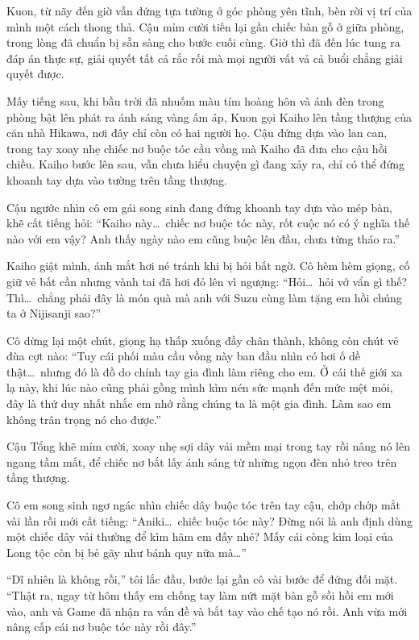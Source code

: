 ﻿\documentclass[../main.tex]{subfiles}
\begin{document}
Kuon, từ nãy đến giờ vẫn đứng tựa tường ở góc phòng yên tĩnh, bèn rời vị trí của mình một cách thong thả. Cậu mỉm cười tiến lại gần chiếc bàn gỗ ở giữa phòng, trong lòng đã chuẩn bị sẵn sàng cho bước cuối cùng. Giờ thì đã đến lúc tung ra đáp án thực sự, giải quyết tất cả rắc rối mà mọi người vất vả cả buổi chẳng giải quyết được.

\ct


Mấy tiếng sau, khi bầu trời đã nhuốm màu tím hoàng hôn và ánh đèn trong phòng bật lên phát ra ánh sáng vàng ấm áp, Kuon gọi Kaiho lên tầng thượng của căn nhà Hikawa, nơi đây chỉ còn có hai người họ. Cậu đứng dựa vào lan can, trong tay xoay nhẹ chiếc nơ buộc tóc cầu vồng mà Kaiho đã đưa cho cậu hồi chiều. Kaiho bước lên sau, vẫn chưa hiểu chuyện gì đang xảy ra, chỉ có thể đứng khoanh tay dựa vào tường trên tầng thượng.

Cậu ngước nhìn cô em gái song sinh đang đứng khoanh tay dựa vào mép bàn, khẽ cất tiếng hỏi: ``Kaiho này\dots\ chiếc nơ buộc tóc này, rốt cuộc nó có ý nghĩa thế nào với em vậy? Anh thấy ngày nào em cũng buộc lên đầu, chưa từng tháo ra.''

Kaiho giật mình, ánh mắt hơi né tránh khi bị hỏi bất ngờ. Cô hèm hèm giọng, cố giữ vẻ bất cần nhưng vành tai đã hơi đỏ lên vì ngượng: ``Hỏi\dots\ hỏi vớ vẩn gì thế? Thì\dots\ chẳng phải đây là món quà mà anh với Suzu cùng làm tặng em hồi chúng ta ở Nijisanji sao?''

Cô dừng lại một chút, giọng hạ thấp xuống đầy chân thành, không còn chút vẻ đùa cợt nào: ``Tuy cái phối màu cầu vồng này ban đầu nhìn có hơi ố dề thật\dots\ nhưng đó là đồ do chính tay gia đình làm riêng cho em. Ở cái thế giới xa lạ này, khi lúc nào cũng phải gồng mình kìm nén sức mạnh đến mức mệt mỏi, đây là thứ duy nhất nhắc em nhớ rằng chúng ta là một gia đình. Làm sao em không trân trọng nó cho được.''

Cậu Tổng khẽ mỉm cười, xoay nhẹ sợi dây vải mềm mại trong tay rồi nâng nó lên ngang tầm mắt, để chiếc nơ bắt lấy ánh sáng từ những ngọn đèn nhỏ treo trên tầng thượng.

Cô em song sinh ngơ ngác nhìn chiếc dây buộc tóc trên tay cậu, chớp chớp mắt vài lần rồi mới cất tiếng: ``Aniki\dots\ chiếc buộc tóc này? Đừng nói là anh định dùng một chiếc dây vải thường để kìm hãm em đấy nhé? Mấy cái còng kim loại của Long tộc còn bị bẻ gãy như bánh quy nữa mà\dots''

``Dĩ nhiên là không rồi,'' tôi lắc đầu, bước lại gần cô vài bước để đứng đối mặt. ``Thật ra, ngay từ hôm thấy em chống tay làm nứt mặt bàn gỗ sồi hồi em mới vào, anh và Game đã nhận ra vấn đề và bắt tay vào chế tạo nó rồi. Anh vừa mới nâng cấp cái nơ buộc tóc này rồi đây.''
\end{document}
